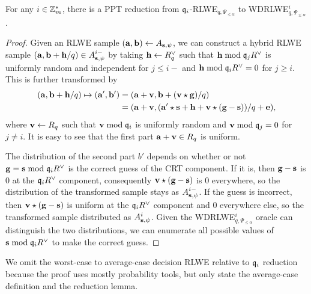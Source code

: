 \documentclass[../main.tex]{subfiles}
\begin{document}
\begin{lemma}
\label{lm:rlweRed2}
For any $i \in \mathbb{Z}_m^*$, there is a PPT reduction from $\mathfrak{q}_i$-RLWE$_{q,\Psi_{\le \alpha}}$ to WDRLWE$_{q,\Psi_{\le \alpha}}^i$.
\end{lemma}

\begin{proof}
Given an RLWE sample $(\mathbf{a},\mathbf{b}) \leftarrow A_{\mathbf{s},\psi}$, we can construct a hybrid RLWE sample $(\mathbf{a},\mathbf{b}+\mathbf{h}/q) \in A_{\mathbf{s},\psi}^{i-}$ by taking $\mathbf{h} \leftarrow R^{\vee}_q$ such that $\mathbf{h} \bmod \mathfrak{q}_j R^{\vee}$ is uniformly random and independent for $j \le i-$ and $\mathbf{h} \bmod \mathfrak{q}_i R^{\vee}=0$ for $j \ge i$. This is further transformed by 
\begin{align*}
    (\mathbf{a},\mathbf{b}+\mathbf{h}/q) \mapsto (\mathbf{a}',\mathbf{b}') &= (\mathbf{a}+\mathbf{v}, \mathbf{b}+(\mathbf{v} \star \mathbf{g})/q)\\
    &=(\mathbf{a}+\mathbf{v},(\mathbf{a}' \star \mathbf{s} + \mathbf{h} + \mathbf{v} \star (\mathbf{g}-\mathbf{s}))/q + \mathbf{e}),
\end{align*}
where $\mathbf{v}\leftarrow R_q$ such that $\mathbf{v} \bmod \mathfrak{q}_i$ is uniformly random and $\mathbf{v} \bmod \mathfrak{q}_j=0$ for $j \neq i$. It is easy to see that the first part $\mathbf{a}+\mathbf{v} \in R_q$ is uniform. 

The distribution of the second part $b'$ depends on whether or not $\mathbf{g}=\mathbf{s} \bmod \mathfrak{q}_i R^{\vee}$ is the correct guess of the CRT component. If it is, then $\mathbf{g}-\mathbf{s}$ is 0 at the $\mathfrak{q}_i R^{\vee}$ component, consequently $\mathbf{v} \star (\mathbf{g}-\mathbf{s})$ is 0 everywhere, so the distribution of the transformed sample stays as $A_{\mathbf{s},\psi}^{i-}$. If the guess is incorrect, then $\mathbf{v} \star (\mathbf{g}-\mathbf{s})$ is uniform at the $\mathfrak{q}_i R^{\vee}$ component and 0 everywhere else, so the transformed sample distributed as $A_{\mathbf{s},\psi}^i$. Given the WDRLWE$_{q,\Psi_{\le \alpha}}^i$ oracle can distinguish the two distributions, we can enumerate all possible values of $\mathbf{s} \bmod \mathfrak{q}_i R^{\vee}$ to make the correct guess. 
\end{proof}

We omit the worst-case to average-case decision RLWE relative to $\mathfrak{q}_i$ reduction because the proof uses mostly probability tools, but only state the average-case definition and the reduction lemma. 
\end{document}
